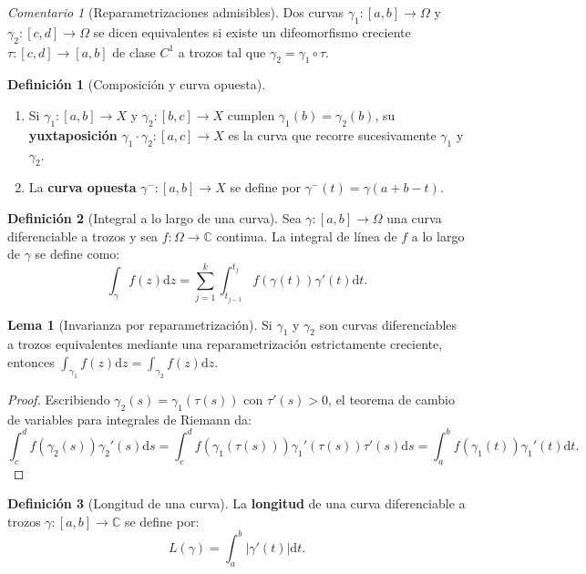 \documentclass[11pt,a4paper]{article}
\theoremstyle{definition}
\newtheorem{definicion}{Definición}[section]
\newtheorem{lema}{Lema}[section]
\theoremstyle{remark}
\newtheorem{observacion}{Comentario}[section]
\numberwithin{equation}{section}
\newcommand{\dz}{\mathrm{d}z}
\newcommand{\dt}{\mathrm{d}t}
\begin{document}
\begin{observacion}[Reparametrizaciones admisibles]
Dos curvas $\gamma_1: [a,b] \to \Omega$ y $\gamma_2: [c,d] \to \Omega$ se dicen equivalentes si existe un difeomorfismo creciente $\tau: [c,d] \to [a,b]$ de clase $C^1$ a trozos tal que $\gamma_2 = \gamma_1 \circ \tau$.
\end{observacion}

\begin{definicion}[Composición y curva opuesta]
\begin{enumerate}
\item Si $\gamma_1: [a,b] \to X$ y $\gamma_2: [b,c] \to X$ cumplen $\gamma_1(b) = \gamma_2(b)$, su \textbf{yuxtaposición} $\gamma_1 \cdot \gamma_2: [a,c] \to X$ es la curva que recorre sucesivamente $\gamma_1$ y $\gamma_2$.
\item La \textbf{curva opuesta} $\gamma^-: [a,b] \to X$ se define por $\gamma^-(t) = \gamma(a + b - t)$.
\end{enumerate}
\end{definicion}

\begin{definicion}[Integral a lo largo de una curva]
Sea $\gamma: [a,b] \to \Omega$ una curva diferenciable a trozos y sea $f: \Omega \to \mathbb{C}$ continua. La integral de línea de $f$ a lo largo de $\gamma$ se define como:
\begin{equation}
\int_\gamma f(z) \dz = \sum_{j=1}^k \int_{t_{j-1}}^{t_j} f(\gamma(t)) \gamma'(t) \dt.
\end{equation}
\end{definicion}

\begin{lema}[Invarianza por reparametrización]
Si $\gamma_1$ y $\gamma_2$ son curvas diferenciables a trozos equivalentes mediante una reparametrización estrictamente creciente, entonces $\int_{\gamma_1} f(z) \dz = \int_{\gamma_2} f(z) \dz$.
\end{lema}
\begin{proof}
Escribiendo $\gamma_2(s) = \gamma_1(\tau(s))$ con $\tau'(s) > 0$, el teorema de cambio de variables para integrales de Riemann da:
\[
\int_c^d f(\gamma_2(s))\gamma_2'(s)\mathrm{d}s = \int_c^d f(\gamma_1(\tau(s)))\gamma_1'(\tau(s))\tau'(s)\mathrm{d}s = \int_a^b f(\gamma_1(t))\gamma_1'(t)\dt.
\]
\end{proof}

\begin{definicion}[Longitud de una curva]
La \textbf{longitud} de una curva diferenciable a trozos $\gamma: [a,b] \to \mathbb{C}$ se define por:
\begin{equation}
L(\gamma) = \int_a^b |\gamma'(t)| \dt.
\end{equation}
\end{definicion}
\end{document}
